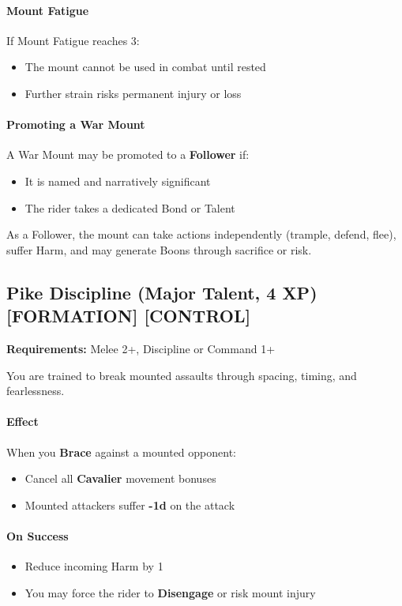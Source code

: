 \paragraph{Mount Fatigue}
If Mount Fatigue reaches 3:
\begin{itemize}
  \item The mount cannot be used in combat until rested
  \item Further strain risks permanent injury or loss
\end{itemize}

\paragraph{Promoting a War Mount}
A War Mount may be promoted to a \textbf{Follower} if:
\begin{itemize}
  \item It is named and narratively significant
  \item The rider takes a dedicated Bond or Talent
\end{itemize}
As a Follower, the mount can take actions independently (trample, defend, flee), suffer Harm, and may generate Boons through sacrifice or risk.

\subsection*{Pike Discipline (Major Talent, 4 XP) \textnormal{[FORMATION] [CONTROL]}}

\textbf{Requirements:} Melee 2+, Discipline or Command 1+

You are trained to break mounted assaults through spacing, timing, and fearlessness.

\paragraph{Effect}
When you \textbf{Brace} against a mounted opponent:
\begin{itemize}
  \item Cancel all \textbf{Cavalier} movement bonuses
  \item Mounted attackers suffer \textbf{-1d} on the attack
\end{itemize}

\paragraph{On Success}
\begin{itemize}
  \item Reduce incoming Harm by 1
  \item You may force the rider to \textbf{Disengage} or risk mount injury
\end{itemize}

